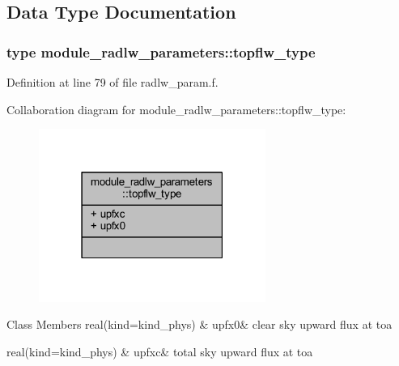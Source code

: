 \subsection{Data Type Documentation}
\label{structmodule__radlw__parameters_1_1topflw__type}
\hypertarget{namespacemodule__radlw__parameters_structmodule__radlw__parameters_1_1topflw__type}{}
\subsubsection{type module\+\_\+radlw\+\_\+parameters\+:\+:topflw\+\_\+type}


Definition at line 79 of file radlw\+\_\+param.\+f.



Collaboration diagram for module\+\_\+radlw\+\_\+parameters\+:\+:topflw\+\_\+type\+:\nopagebreak
\begin{figure}[H]
\begin{center}
\leavevmode
\includegraphics[width=210pt]{structmodule__radlw__parameters_1_1topflw__type__coll__graph}
\end{center}
\end{figure}
\begin{DoxyFields}{Class Members}
real(kind=kind\+\_\+phys)\hypertarget{group__module__radlw__main_ga7080fda1f732474077aeb302b57351cb}{}\label{group__module__radlw__main_ga7080fda1f732474077aeb302b57351cb}
&
upfx0&
clear sky upward flux at toa \\
\hline

real(kind=kind\+\_\+phys)\hypertarget{group__module__radlw__main_ga19ff2669a279a1db869766c0e3d88981}{}\label{group__module__radlw__main_ga19ff2669a279a1db869766c0e3d88981}
&
upfxc&
total sky upward flux at toa \\
\hline

\end{DoxyFields}
